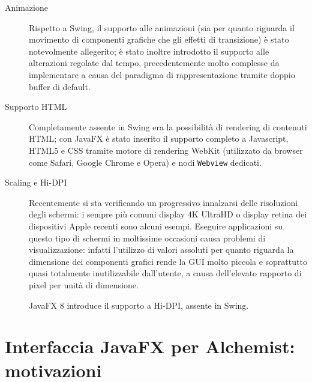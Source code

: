 \begin{description}
              \item[Animazione] Rispetto a Swing, il supporto alle animazioni (sia per quanto riguarda il movimento di componenti grafiche che gli effetti di transizione) è stato notevolmente allegerito; è stato inoltre introdotto il supporto alle alterazioni regolate dal tempo, precedentemente molto complesse da implementare a causa del paradigma di rappresentazione tramite doppio buffer di default.

              \item[Supporto HTML] Completamente assente in Swing era la possibilità di rendering di contenuti HTML; con JavaFX è stato inserito il supporto completo a Javascript, HTML5 e CSS tramite motore di rendering WebKit (utilizzato da browser come Safari, Google Chrome e Opera) e nodi \texttt{Webview} dedicati.

              \item[Scaling e Hi-DPI] Recentemente si sta verificando un progressivo innalzarsi delle risoluzioni degli schermi: i sempre più comuni display 4K UltraHD o display retina dei dispositivi Apple recenti sono alcuni esempi.
              Eseguire applicazioni su questo tipo di schermi in moltissime occasioni causa problemi di visualizzazione: infatti l'utilizzo di valori assoluti per quanto riguarda la dimensione dei componenti grafici rende la GUI molto piccola e soprattutto quasi totalmente inutilizzabile dall’utente, a causa dell'elevato rapporto di pixel per unità di dimensione.

              JavaFX 8 introduce il supporto a Hi-DPI, assente in Swing.
            \end{description}

    \section{Interfaccia JavaFX per Alchemist: motivazioni}\label{sec:motivi}
